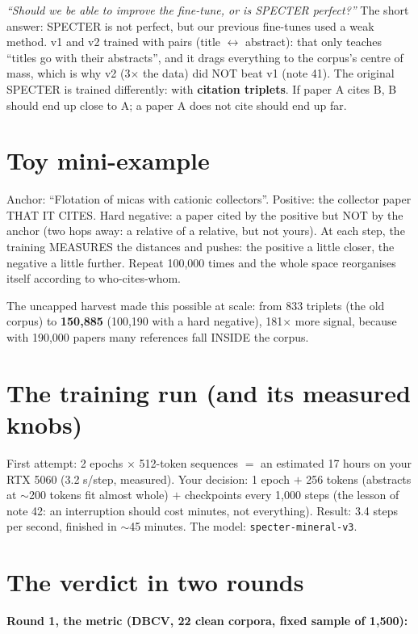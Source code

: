 \documentclass[11pt,a4paper]{article}
\begin{document}
\emph{``Should we be able to improve the fine-tune, or is SPECTER perfect?''} The short answer:
SPECTER is not perfect, but our previous fine-tunes used a weak method. v1 and v2 trained with
pairs (title $\leftrightarrow$ abstract): that only teaches ``titles go with their abstracts'',
and it drags everything to the corpus's centre of mass, which is why v2 (3$\times$ the data)
did NOT beat v1 (note 41). The original SPECTER is trained differently: with \textbf{citation
triplets}. If paper A cites B, B should end up close to A; a paper A does not cite should end
up far.

\section{Toy mini-example}

Anchor: ``Flotation of micas with cationic collectors''. Positive: the collector paper THAT IT
CITES. Hard negative: a paper cited by the positive but NOT by the anchor (two hops away: a
relative of a relative, but not yours). At each step, the training MEASURES the distances and
pushes: the positive a little closer, the negative a little further. Repeat 100,000 times and
the whole space reorganises itself according to who-cites-whom.

The uncapped harvest made this possible at scale: from 833 triplets (the old corpus) to
\textbf{150,885} (100,190 with a hard negative), 181$\times$ more signal, because with 190,000
papers many references fall INSIDE the corpus.

\section{The training run (and its measured knobs)}

First attempt: 2 epochs $\times$ 512-token sequences $=$ an estimated 17 hours on your RTX 5060
(3.2 s/step, measured). Your decision: 1 epoch $+$ 256 tokens (abstracts at $\sim$200 tokens fit
almost whole) $+$ checkpoints every 1,000 steps (the lesson of note 42: an interruption should
cost minutes, not everything). Result: 3.4 steps per second, finished in $\sim$45 minutes. The
model: \texttt{specter-mineral-v3}.

\section{The verdict in two rounds}

\textbf{Round 1, the metric (DBCV, 22 clean corpora, fixed sample of 1,500):}
\end{document}
